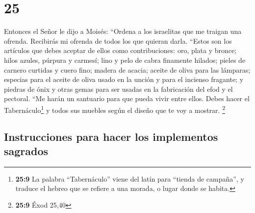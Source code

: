 \hypertarget{section-24}{%
\section{25}\label{section-24}}

 Entonces el Señor le dijo a Moisés: 
``Ordena a los israelitas que me traigan una ofrenda. Recibirás mi
ofrenda de todos los que quieran darla.  ``Estos son los
artículos que debes aceptar de ellos como contribuciones: oro, plata y
bronce;  hilos azules, púrpura y carmesí; lino y pelo de
cabra finamente hilados;  pieles de carnero curtidas y
cuero fino; madera de acacia;  aceite de oliva para las
lámparas; especias para el aceite de oliva usado en la unción y para el
incienso fragante;  y piedras de ónix y otras gemas para
ser usadas en la fabricación del efod y el pectoral.  ``Me
harán un santuario para que pueda vivir entre ellos. 
Debes hacer el Tabernáculo\footnote{\textbf{25:9} La palabra
  ``Tabernáculo'' viene del latín para ``tienda de campaña'', y traduce
  el hebreo que se refiere a una morada, o lugar donde se habita.} y
todos sus muebles según el diseño que te voy a mostrar. \footnote{\textbf{25:9}
  Éxod 25,40}

\hypertarget{instrucciones-para-hacer-los-implementos-sagrados}{%
\subsection{Instrucciones para hacer los implementos
sagrados}\label{instrucciones-para-hacer-los-implementos-sagrados}}


